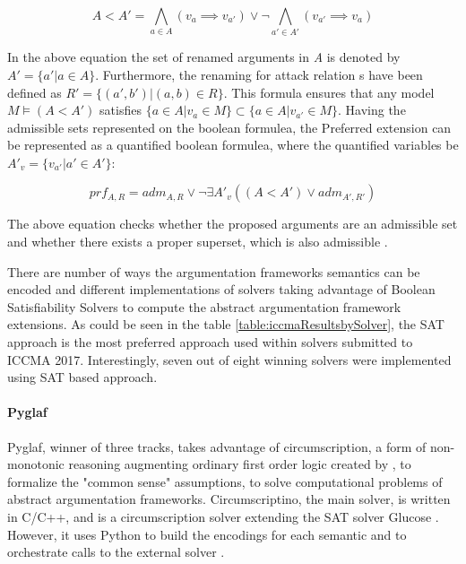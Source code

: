 \begin{equation}
A < A' = \bigwedge\limits_{a \in A} (v_a \implies v_{a'}) \lor \neg \bigwedge\limits_{a' \in A'} (v_{a'} \implies v_a)
\end{equation}

In the above equation the set of renamed arguments in \textit{A} is denoted by $A' = \{a' | a \in A\}$. Furthermore, the renaming for attack relation s have been defined as $R' = \{(a',b') | (a,b) \in R\}$. This formula ensures that any model $ M \models (A < A')$ satisfies $ \{a \in A | v_a \in M\} \subset \{a \in A | v_{a'} \in M\} $. Having the admissible sets represented on the boolean formulea, the Preferred extension can be represented as a quantified boolean formulea, where the quantified variables be $ A'_v = \{v_{a'} | a' \in A'\} $:

\begin{equation}
prf_{A,R} = adm_{A,R} \lor \neg \exists A'_v ((A < A') \lor adm_{A',R'})
\end{equation}

The above equation checks whether the proposed arguments are an admissible set and whether there exists a proper superset, which is also admissible \citep{solvingMethods}.

There are number of ways the argumentation frameworks semantics can be encoded and different implementations of solvers taking advantage of Boolean Satisfiability Solvers to compute the abstract argumentation framework extensions. As could be seen in the table \ref{table:iccmaResultsbySolver}, the SAT approach is the most preferred approach used within solvers submitted to ICCMA 2017. Interestingly, seven out of eight winning solvers were implemented using SAT based approach. 

\paragraph{Pyglaf} \label{section:pyglaf}
Pyglaf, winner of three tracks, takes advantage of circumscription, a form of non-monotonic reasoning augmenting ordinary first order logic created by \citet{circumpscription}, to formalize the "common sense" assumptions, to solve computational problems of abstract argumentation frameworks.  Circumscriptino, the main solver, is written in C/C++, and is a circumscription solver extending the SAT solver Glucose \citep{glucose}. However, it uses Python to build the encodings for each semantic and to orchestrate calls to the external solver \citep{pyglaf}. 

